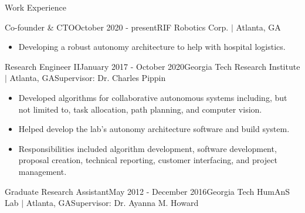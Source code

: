 \documentclass{resume} %
\newcommand{\sectionspace}{\vspace{3mm}}
\begin{document}

\sectionspace
\begin{rSection}{Work Experience}

\begin{rSubsection}{Co-founder \& CTO}{October 2020 - present}{RIF Robotics Corp. $\vert$ Atlanta, GA}{}

\item
\begin{itemize}
\item Developing a robust autonomy architecture to help with hospital logistics.

\end{itemize}

\end{rSubsection}


\begin{rSubsection}{Research Engineer II}{January 2017 - October 2020}{Georgia Tech Research Institute $\vert$ Atlanta, GA}{Supervisor: Dr. Charles Pippin}

\item
\begin{itemize}
\item Developed algorithms for collaborative autonomous systems including, but
  not limited to, task allocation, path planning, and computer vision.

\item Helped develop the lab’s autonomy architecture software and build system.

\item Responsibilities included algorithm development, software development,
  proposal creation, technical reporting, customer interfacing, and project
  management.

\end{itemize}

\end{rSubsection}


\begin{rSubsection}{Graduate Research Assistant}{May 2012 - December 2016}{Georgia Tech HumAnS Lab $\vert$ Atlanta, GA}{Supervisor: Dr. Ayanna M. Howard}


\end{rSubsection}
\end{rSection}
\end{document}
